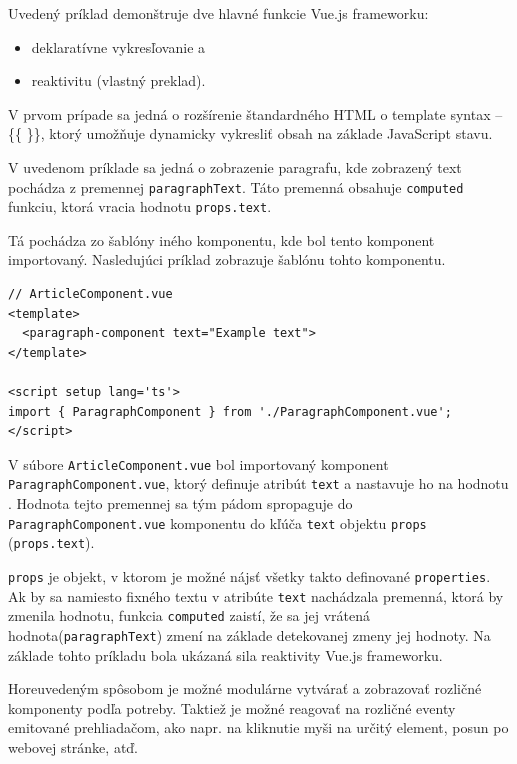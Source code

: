 Uvedený príklad demonštruje dve hlavné funkcie Vue.js frameworku:
\begin {itemize}
\item {deklaratívne vykresľovanie a}
\item {reaktivitu \cite{vuejs_introduction} (vlastný preklad).}
\end {itemize}

V prvom prípade sa jedná o rozšírenie štandardného HTML o template syntax -- \{\{ \}\}, ktorý umožňuje dynamicky vykresliť obsah na základe JavaScript stavu.

V uvedenom príklade sa jedná o zobrazenie paragrafu, kde zobrazený text pochádza z premennej \texttt{paragraphText}. Táto premenná obsahuje \texttt{computed} funkciu, ktorá vracia hodnotu \texttt{props.text}.

Tá pochádza zo šablóny iného komponentu, kde bol tento komponent importovaný. Nasledujúci príklad zobrazuje šablónu tohto komponentu.

\begin{minipage}[]{\linewidth}
\begin{verbatim}
// ArticleComponent.vue
<template>
  <paragraph-component text="Example text">
</template>

<script setup lang='ts'>
import { ParagraphComponent } from './ParagraphComponent.vue';
</script>
\end{verbatim}
\end{minipage}

V súbore \texttt{ArticleComponent.vue} bol importovaný komponent \newline \texttt{ParagraphComponent.vue}, ktorý definuje atribút \texttt{text} a nastavuje ho na hodnotu . Hodnota tejto premennej sa tým pádom spropaguje do
\texttt{ParagraphComponent.vue} komponentu do kľúča \texttt{text} objektu \texttt{props} (\texttt{props.text}).

\texttt{props} je objekt, v ktorom je možné nájsť všetky takto definované \texttt{properties}. Ak by sa namiesto fixného textu v atribúte \texttt{text} nachádzala premenná, ktorá by zmenila hodnotu, funkcia \texttt{computed} zaistí, že sa jej vrátená hodnota\newline (\texttt{paragraphText}) zmení na základe detekovanej zmeny jej hodnoty.
Na základe tohto príkladu bola ukázaná sila reaktivity Vue.js frameworku.

Horeuvedeným spôsobom je možné modulárne vytvárať a zobrazovať rozličné komponenty podľa potreby. Taktiež je možné reagovať na rozličné eventy emitované prehliadačom, ako napr. na kliknutie myši na určitý element, posun po webovej stránke, atď.


